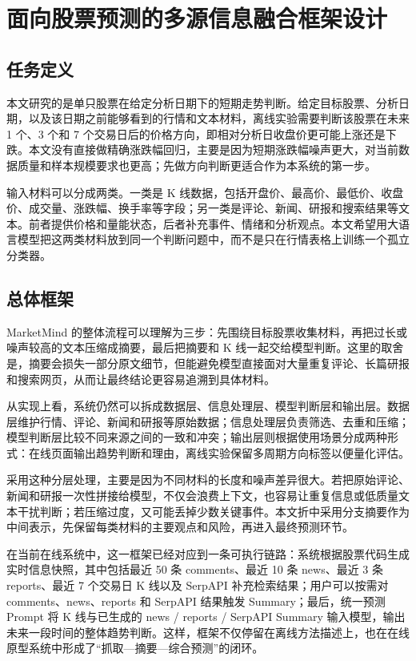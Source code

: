 
\chapter{面向股票预测的多源信息融合框架设计}

\section{任务定义}

本文研究的是单只股票在给定分析日期下的短期走势判断。给定目标股票、分析日期，以及该日期之前能够看到的行情和文本材料，离线实验需要判断该股票在未来 1 个、3 个和 7 个交易日后的价格方向，即相对分析日收盘价更可能上涨还是下跌。本文没有直接做精确涨跌幅回归，主要是因为短期涨跌幅噪声更大，对当前数据质量和样本规模要求也更高；先做方向判断更适合作为本系统的第一步。

输入材料可以分成两类。一类是 K 线数据，包括开盘价、最高价、最低价、收盘价、成交量、涨跌幅、换手率等字段；另一类是评论、新闻、研报和搜索结果等文本。前者提供价格和量能状态，后者补充事件、情绪和分析观点。本文希望用大语言模型把这两类材料放到同一个判断问题中，而不是只在行情表格上训练一个孤立分类器。

\section{总体框架}

MarketMind 的整体流程可以理解为三步：先围绕目标股票收集材料，再把过长或噪声较高的文本压缩成摘要，最后把摘要和 K 线一起交给模型判断。这里的取舍是，摘要会损失一部分原文细节，但能避免模型直接面对大量重复评论、长篇研报和搜索网页，从而让最终结论更容易追溯到具体材料。

从实现上看，系统仍然可以拆成数据层、信息处理层、模型判断层和输出层。数据层维护行情、评论、新闻和研报等原始数据；信息处理层负责筛选、去重和压缩；模型判断层比较不同来源之间的一致和冲突；输出层则根据使用场景分成两种形式：在线页面输出趋势判断和理由，离线实验保留多周期方向标签以便量化评估。

采用这种分层处理，主要是因为不同材料的长度和噪声差异很大。若把原始评论、新闻和研报一次性拼接给模型，不仅会浪费上下文，也容易让重复信息或低质量文本干扰判断；若压缩过度，又可能丢掉少数关键事件。本文折中采用分支摘要作为中间表示，先保留每类材料的主要观点和风险，再进入最终预测环节。

在当前在线系统中，这一框架已经对应到一条可执行链路：系统根据股票代码生成实时信息快照，其中包括最近 50 条 comments、最近 10 条 news、最近 3 条 reports、最近 7 个交易日 K 线以及 SerpAPI 补充检索结果；用户可以按需对 comments、news、reports 和 SerpAPI 结果触发 Summary；最后，统一预测 Prompt 将 K 线与已生成的 news / reports / SerpAPI Summary 输入模型，输出未来一段时间的整体趋势判断。这样，框架不仅停留在离线方法描述上，也在在线原型系统中形成了“抓取—摘要—综合预测”的闭环。

